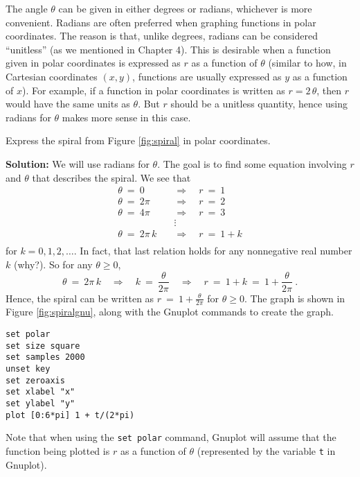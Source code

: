 The angle $\theta$ can be given in either degrees or radians, whichever is more convenient. Radians
are often preferred when graphing functions in polar coordinates. The reason is that, 
unlike degrees, radians can be considered ``unitless'' (as we mentioned in
Chapter 4). This is desirable when a function
given in polar coordinates is expressed as $r$ as a function of $\theta$ (similar to how, in Cartesian
coordinates $(x,y)$, functions are usually expressed as $y$ as a function of $x$). For example, if a
function in polar coordinates is written as $r = 2\,\theta$, then $r$ would have the same units as
$\theta$. But $r$ should be a unitless quantity, hence using radians for $\theta$ makes more sense
in this case.
\newpage
\begin{exmp}
 Express the spiral from Figure \ref{fig:spiral} in polar coordinates.\vspace{1mm}
 \par\noindent\textbf{Solution:} We will use radians for $\theta$. The goal is to find some equation
 involving $r$ and $\theta$ that describes the spiral. We see that
 \begin{align*}
  \theta ~=~ 0 \quad&\Rightarrow\quad r ~=~ 1\\
  \theta ~=~ 2\pi \quad&\Rightarrow\quad r ~=~ 2\\
  \theta ~=~ 4\pi \quad&\Rightarrow\quad r ~=~ 3\\
  &\vdots\\
  \theta ~=~ 2\pi\,k \quad&\Rightarrow\quad r ~=~ 1+k\\
 \end{align*}
 for $k=0,1,2,\ldots$. In fact, that last relation holds for any nonnegative real number $k$ (why?).
 So for any $\theta \ge 0$,
 \begin{displaymath}
  \theta ~=~ 2\pi\,k \quad\Rightarrow\quad k ~=~ \frac{\theta}{2\pi} \quad\Rightarrow\quad r ~=~
  1 + k ~=~ 1 + \frac{\theta}{2\pi} ~.
 \end{displaymath}
 Hence, the spiral can be written as $\boxed{r ~=~ 1 + \frac{\theta}{2\pi}}$ for $\theta \ge 0$. The
 graph is shown in Figure \ref{fig:spiralgnu}, along with the Gnuplot commands to create the graph.

\parpic[r]{
\scalebox{0.90}{}}
\begin{verbatim}
set polar
set size square
set samples 2000
unset key
set zeroaxis
set xlabel "x"
set ylabel "y"
plot [0:6*pi] 1 + t/(2*pi)
\end{verbatim}\vspace{-30mm}
Note that when using the \texttt{set polar} command, Gnuplot will assume that the function being
plotted is $r$ as a function of $\theta$ (represented by the variable \texttt{t} in Gnuplot).
\end{exmp}\vspace{-1mm}
